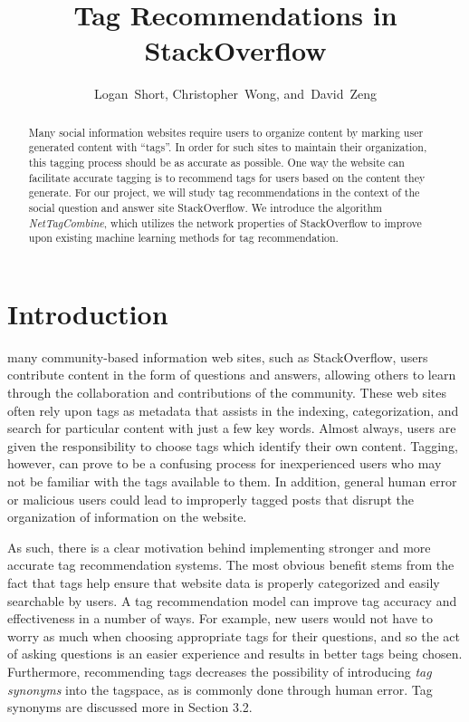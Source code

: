 \documentclass[10pt]{IEEEtran}
\begin{document}
\title{Tag Recommendations in StackOverflow}
\author{Logan~Short, Christopher~Wong, and~David~Zeng}%
\maketitle

\begin{abstract}
Many social information websites require users to organize content by marking user generated content with ``tags''. In order for such sites to maintain their organization, this tagging process should be as accurate as possible. One way the website can facilitate accurate tagging is to recommend tags for users based on the content they generate.
For our project, we will study tag recommendations in the context of the social question and answer site StackOverflow. We introduce the algorithm \textit{NetTagCombine}, which utilizes the network properties of StackOverflow to improve upon existing machine learning methods for tag recommendation.
\end{abstract}

\section{Introduction}

 many community-based information web sites, such as StackOverflow, users contribute content in the form of questions and answers, allowing others to learn through the collaboration and contributions of the community. These web sites often rely upon tags as metadata that assists in the indexing, categorization, and search for particular content with just a few key words. Almost always, users are given the responsibility to choose tags which identify their own content. Tagging, however, can prove to be a confusing process for inexperienced users who may not be familiar with the tags available to them. In addition, general human error or malicious users could lead to improperly tagged posts that disrupt the organization of information on the website.

As such, there is a clear motivation behind implementing stronger and more accurate tag recommendation systems. The most obvious benefit stems from the fact that tags help ensure that website data is properly categorized and easily searchable by users. A tag recommendation model can improve tag accuracy and effectiveness in a number of ways. For example, new users would not have to worry as much when choosing appropriate tags for their questions, and so the act of asking questions is an easier experience and results in better tags being chosen. Furthermore, recommending tags decreases the possibility of introducing \textit{tag synonyms} into the tagspace, as is commonly done through human error. Tag synonyms are discussed more in Section 3.2.
\end{document}
